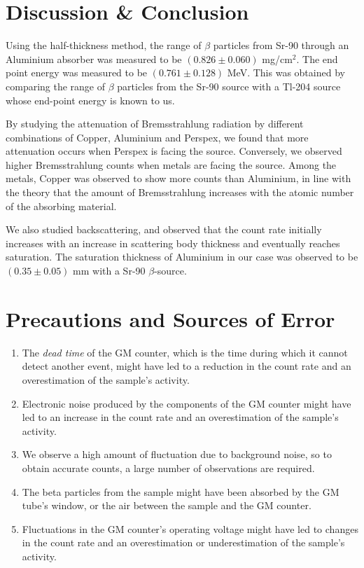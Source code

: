 \section{Discussion \& Conclusion}

Using the half-thickness method, the range of $\beta$ particles from Sr-90 through an Aluminium absorber was measured to be $(0.826 \pm 0.060)$ mg/cm$^2$. The end point energy was measured to be $(0.761\pm 0.128)$ MeV. This was obtained by comparing the range of $\beta$ particles from the Sr-90 source with a Tl-204 source whose end-point energy is known to us.

By studying the attenuation of Bremsstrahlung radiation by different combinations of Copper, Aluminium and Perspex, we found that more attenuation occurs when Perspex is facing the source. Conversely, we observed higher Bremsstrahlung counts when metals are facing the source. Among the metals, Copper was observed to show more counts than Aluminium, in line with the theory that the amount of Bremsstrahlung increases with the atomic number of the absorbing material.

We also studied backscattering, and observed that the count rate initially increases with an increase in scattering body thickness and eventually reaches saturation. The saturation thickness of Aluminium in our case was observed to be $(0.35 \pm 0.05)$ mm with a Sr-90 $\beta$-source. 

\section{Precautions and Sources of Error}

    \begin{enumerate}
        \item The \textit{dead time} of the GM counter, which is the time during which it cannot detect another event, might have led to a reduction in the count rate and an overestimation of the sample’s activity.
        \item Electronic noise produced by the components of the GM counter might have led to an increase in the count rate and an overestimation of the sample’s activity.
        \item We observe a high amount of fluctuation due to background noise, so to obtain accurate counts, a large number of observations are required.
        \item The beta particles from the sample might have been absorbed by the GM tube’s window, or the air between the sample and the GM counter. 
        \item Fluctuations in the GM counter’s operating voltage might have led to changes in the count rate and an overestimation or underestimation of the sample’s activity.
    \end{enumerate}